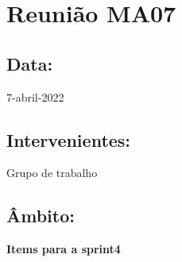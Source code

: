 \section{Reunião MA07}\label{reuniaoMA07}

\subsection*{Data:}
7-abril-2022

\subsection*{Intervenientes:}
Grupo de trabalho

\subsection*{Âmbito:}

\textbf{Items para a sprint4}

